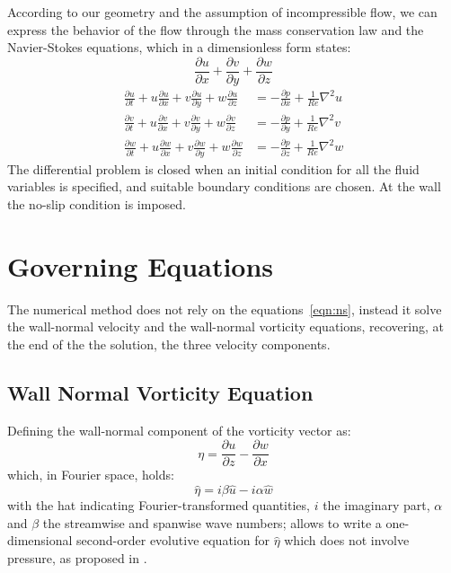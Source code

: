 According to our geometry and the assumption of incompressible flow, we can express the behavior of the flow through the mass conservation law and the Navier-Stokes equations, which in a dimensionless form states:\\
\begin{equation}
\frac{\partial u}{\partial x} + \frac{\partial v}{\partial y} + \frac{\partial w}{\partial z}
\label{mass:cons}
\end{equation}
\begin{subequations}
\label{eqn:ns}
\begin{align}
\frac{\partial u}{\partial t} + u\frac{\partial u}{\partial x} + v\frac{\partial u}{\partial y} + w\frac{\partial u}{\partial z} &= 
- \frac{\partial p}{\partial x} + \frac{1}{Re} \nabla^{2}u  \label{eqn:ns:1}\\
\frac{\partial v}{\partial t} + u\frac{\partial v}{\partial x} + v\frac{\partial v}{\partial y} + w\frac{\partial v}{\partial z} &= 
- \frac{\partial p}{\partial y} + \frac{1}{Re}\nabla^{2}v \label{eqn:ns:2}\\
\frac{\partial w}{\partial t} + u\frac{\partial w}{\partial x} + v\frac{\partial w}{\partial y} + w\frac{\partial w}{\partial z} &= 
- \frac{\partial p}{\partial z} + \frac{1}{Re}\nabla^{2}w \label{eqn:ns:3}
\end{align}
\end{subequations}
The differential problem is closed when an initial condition for all the fluid variables is specified, and suitable boundary conditions are chosen. At the wall the no-slip condition is imposed.





\section{Governing Equations}
The numerical method does not rely on the equations~\eqref{eqn:ns}, instead it solve the wall-normal velocity and the wall-normal vorticity equations, recovering, at the end of the the solution, the three velocity components.\\
\subsection{Wall Normal Vorticity Equation}
Defining the wall-normal component of the vorticity vector as:
\[
\eta = \frac{\partial u}{\partial z} - \frac{\partial w}{\partial x}
\]
which, in Fourier space, holds:
\[
\hat{\eta} = i\beta \hat{u} - i \alpha \hat{w}
\] 
with the hat indicating Fourier-transformed quantities, $i$ the imaginary part, $\alpha$ and $\beta$ the streamwise and spanwise wave numbers;  allows to write a one-dimensional second-order evolutive equation for $\hat{\eta}$ which does not involve pressure, as proposed in \cite{kim_moin_moser}.

